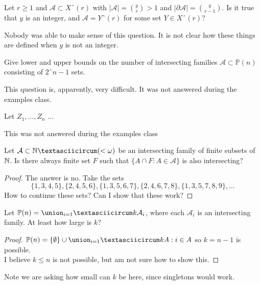 \documentclass[a4paper]{article}
\newcommand{\shadow}{\partial}
\renewcommand{\P}{\mathbb{P}}
\renewcommand{\A}{\mathcal{A}}
\begin{document}
\begin{question}[Question 12]
  Let $r \geq 1$ and $\A \subset Xˆ{(r)}$ with $|\A| =
  \binom{y}{r} > 1$ and $|\shadow{\A}| = \binom{y}{r-1}$. Is it true that $y$ is
  an integer, and $\A = Yˆ{(r)}$ for some set $Y \in Xˆ{(r)}$?
\end{question}
\begin{remark}
  Nobody was able to make sense of this question. It is not clear how these
  things are defined when $y$ is not an integer.
\end{remark}

\begin{question}[Question 13]
  Give lower and upper bounds on the number of intersecting families $\A \subset
  \P(n)$ consisting of $2ˆ{n-1}$ sets.
\end{question}
\begin{remark}
  This question is, apparently, very difficult. It was not answered during the
  examples class.
\end{remark}

\begin{question}[Question 14]
  Let $Z_1, \dots, Z_n$ ...
\end{question}
\begin{remark}
  This was not answered during the examples class
\end{remark}

\begin{question}[Question 15]
  Let $\A \subset \Nˆ{(< \omega)}$ be an intersecting family of finite subsets
  of $\N$. Is there always finite set $F$ such that $\{A \cap F : A \in \A\}$ is
  also intersecting?
\end{question}
\begin{proof}
  The answer is no. Take the sets
  \[\{1, 3, 4, 5\}, \{2, 4, 5, 6\}, \{1, 3, 5, 6, 7\}, \{2, 4, 6, 7, 8\}, \{1,
    3, 5, 7, 8, 9\}, \dots\]
  How to continue these sets? Can I show that these work?
  \end{proof}

  \begin{question}[Question 16]
    Let $\P(n) = \union_{i = 1}ˆ{k} \A_i$, where each $\A_i$ is an intersecting
    family. At least how large is $k$?
  \end{question}
  \begin{proof}
    $\P(n) = \{\emptyset\} \cup \union_{i = 1}ˆ{k} {A : i \in A}$ so $k =
    n-1$ is possible.\\
    I believe $k \leq n$ is not possible, but am not sure how to show this.
  \end{proof}
  \begin{remark}
    Note we are asking how small can $k$ be here, since singletons would work.
  \end{remark}
\end{document}
